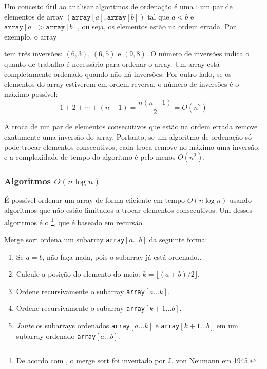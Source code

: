 Um conceito útil ao analisar algoritmos de ordenação é uma :
um par de elementos de array
$(\texttt{array}[a],\texttt{array}[b])$ tal que
$a<b$ e $\texttt{array}[a]>\texttt{array}[b]$,
ou seja, os elementos estão na ordem errada. 
Por exemplo, o array
\begin{center}
\end{center}
tem três inversões: $(6,3)$, $(6,5)$ e $(9,8)$.
O número de inversões indica o quanto de trabalho é necessário para ordenar o array. 
Um array está completamente ordenado quando não há inversões.
Por outro lado, se os elementos do array estiverem em ordem reversa, o número de inversões é o máximo possível:
\[1+2+\cdots+(n-1)=\frac{n(n-1)}{2} = O(n^2)\]

A troca de um par de elementos consecutivos que estão na ordem errada remove exatamente uma inversão do array.
Portanto, se um algoritmo de ordenação só pode trocar elementos consecutivos, cada troca remove no máximo uma inversão, e a complexidade de tempo do algoritmo é pelo menos $O(n^2)$.

\subsubsection{Algoritmos $O(n \log n)$}


É possível ordenar um array de forma eficiente em
tempo $O(n \log n)$ usando algoritmos que não estão limitados a trocar elementos consecutivos.
Um desses algoritmos é o \footnote{De acordo com \cite{knu983},
o merge sort foi inventado por J. von Neumann em 1945.},
que é baseado em recursão.


Merge sort ordena um subarray \texttt{array}$[a \ldots b]$ da seguinte forma:

\begin{enumerate}
\item Se $a=b$, não faça nada, pois o subarray já está ordenado..
\item Calcule a posição do elemento do meio: $k=\lfloor (a+b)/2 \rfloor$.
\item Ordene recursivamente o subarray \texttt{array}$[a \ldots k]$.
\item Ordene recursivamente o subarray \texttt{array}$[k+1 \ldots b]$.
\item \emph{Junte} os subarrays ordenados \texttt{array}$[a \ldots k]$ e
\texttt{array}$[k+1 \ldots b]$
em um subarray ordenado \texttt{array}$[a \ldots b]$.
\end{enumerate}

